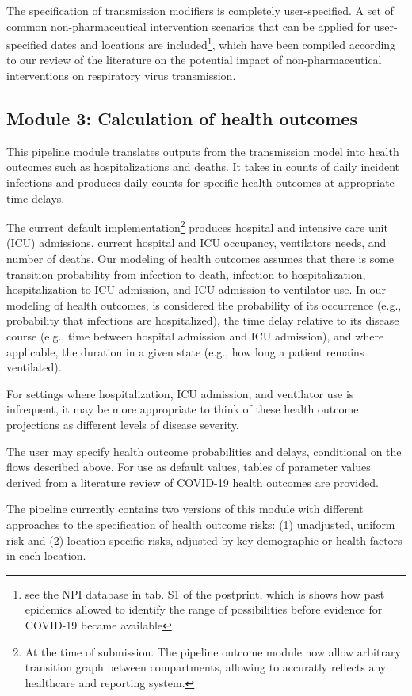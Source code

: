 {The specification of transmission modifiers is completely user-specified. A set of common non-pharmaceutical intervention scenarios that can be applied for user-specified dates and locations are included\footnote{see the NPI database in tab. S1 of the postprint, which is shows how past epidemics allowed to identify the range of possibilities before evidence for COVID-19 became available}, which have been compiled according to our review of the literature on the potential impact of non-pharmaceutical interventions on respiratory virus transmission.


\subsection{Module 3: Calculation of health outcomes}
This pipeline module translates outputs from the transmission model into health outcomes such as hospitalizations and deaths. It takes in counts of daily incident infections and produces daily counts for specific health outcomes at appropriate time delays.

The current default implementation\footnote{At the time of submission. The pipeline outcome module now allow arbitrary transition graph between compartments, allowing to accuratly reflects any healthcare and reporting system.} produces hospital and intensive care unit (ICU) admissions, current hospital and ICU occupancy, ventilators needs, and number of deaths. Our modeling of health outcomes assumes that there is some transition probability from infection to death, infection to hospitalization, hospitalization to ICU admission, and ICU admission to ventilator use. In our modeling of health outcomes, is considered the probability of its occurrence (e.g., probability that infections are hospitalized), the time delay relative to its disease course (e.g., time between hospital admission and ICU admission), and where applicable, the duration in a given state (e.g., how long a patient remains ventilated).

For settings where hospitalization, ICU admission, and ventilator use is infrequent, it may be more appropriate to think of these health outcome projections as different levels of disease severity.

The user may specify health outcome probabilities and delays, conditional on the flows described above. For use as default values, tables of parameter values derived from a literature review of COVID-19 health outcomes are provided.

The pipeline currently contains two versions of this module with different approaches to the specification of health outcome risks: (1) unadjusted, uniform risk and (2) location-specific risks, adjusted by key demographic or health factors in each location.

}
